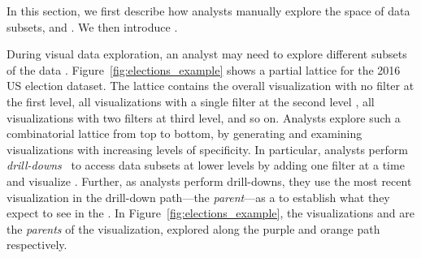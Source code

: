In this section, we first describe how analysts
manually explore the space of data subsets,
and .
We then introduce .

During visual data exploration,
an analyst may need to explore different subsets
of the data .
Figure~\ref{fig:elections_example}
shows a partial lattice for the 2016 US election dataset.
The lattice contains the overall visualization
with no filter at the first level,
all visualizations with a single filter
at the second level ,
all visualizations with two filters at third level,
and so on.
Analysts explore such a combinatorial lattice
from top to bottom, by generating and examining
visualizations with increasing levels of specificity.
In particular, analysts perform \emph{drill-downs}~\cite{OLAP}
to access data subsets at lower levels by
adding one filter at a time
and visualize
.
Further, as analysts perform drill-downs,
they use the most recent visualization
in the drill-down path---the {\em parent}---as a 
to establish what they expect to see in the
.
In Figure~\ref{fig:elections_example},
the visualizations \fem and \blk
are the \emph{parents} of the \blkfem visualization,
explored along the purple and orange path respectively.

